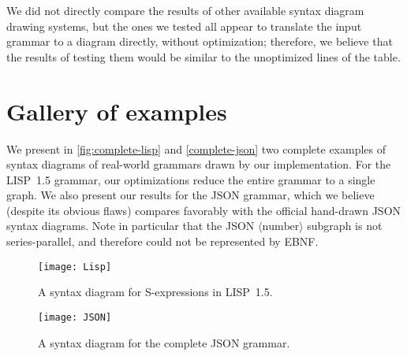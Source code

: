 \documentclass[10pt]{llncs}
\newcommand{\nonterm}[1]{\langle\text{#1}\rangle}
\begin{document}
We did not directly compare the results of other available syntax diagram drawing systems, but the ones we tested all appear to translate the input grammar to a diagram directly, without optimization; therefore, we believe that the results of testing them would be similar to the unoptimized lines of the table.

\section{Gallery of examples}

\renewcommand{\topfraction}{0.9}

We present in \autoref{fig:complete-lisp} and \autoref{complete-json} two complete examples of syntax diagrams of real-world grammars drawn by our implementation. For the LISP~1.5 grammar, our optimizations reduce the entire grammar to a single graph. We also present our results for the JSON grammar, which we believe (despite its obvious flaws) compares favorably with the official hand-drawn JSON syntax diagrams. Note in particular that the JSON $\nonterm{number}$ subgraph is not series-parallel, and therefore could not be represented by EBNF.

\begin{figure}[t]
\centering
\texttt{[image: Lisp]}
\caption{A syntax diagram for S-expressions in LISP~1.5.}
\label{fig:complete-lisp}
\end{figure}

\begin{figure}[t]
\centering
\texttt{[image: JSON]}
\caption{A syntax diagram for the complete JSON grammar.}
\label{complete-json}
\end{figure}



\end{document}

